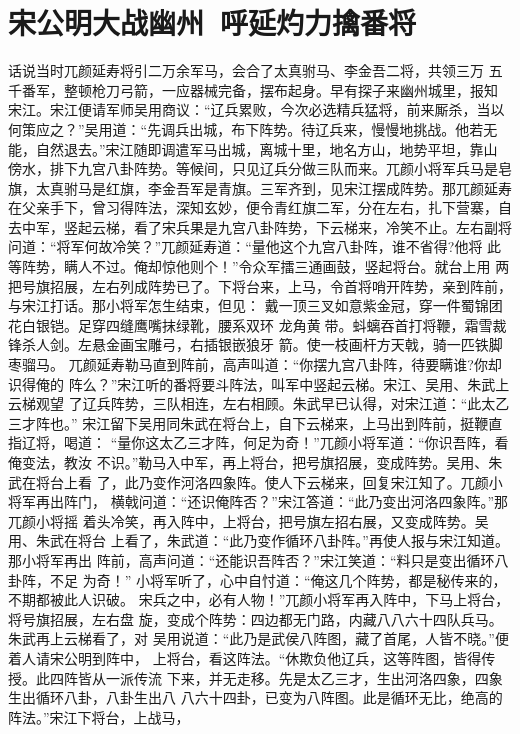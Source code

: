 \chapter{宋公明大战幽州~呼延灼力擒番将}

话说当时兀颜延寿将引二万余军马，会合了太真驸马、李金吾二将，共领三万
五千番军，整顿枪刀弓箭，一应器械完备，摆布起身。早有探子来幽州城里，报知
宋江。宋江便请军师吴用商议：“辽兵累败，今次必选精兵猛将，前来厮杀，当以
何策应之？”吴用道：“先调兵出城，布下阵势。待辽兵来，慢慢地挑战。他若无
能，自然退去。”宋江随即调遣军马出城，离城十里，地名方山，地势平坦，靠山
傍水，排下九宫八卦阵势。等候间，只见辽兵分做三队而来。兀颜小将军兵马是皂
旗，太真驸马是红旗，李金吾军是青旗。三军齐到，见宋江摆成阵势。那兀颜延寿
在父亲手下，曾习得阵法，深知玄妙，便令青红旗二军，分在左右，扎下营寨，自
去中军，竖起云梯，看了宋兵果是九宫八卦阵势，下云梯来，冷笑不止。左右副将
问道：“将军何故冷笑？”兀颜延寿道：“量他这个九宫八卦阵，谁不省得?他将
此等阵势，瞒人不过。俺却惊他则个！”令众军擂三通画鼓，竖起将台。就台上用
两把号旗招展，左右列成阵势已了。下将台来，上马，令首将哨开阵势，亲到阵前，
与宋江打话。那小将军怎生结束，但见：
戴一顶三叉如意紫金冠，穿一件蜀锦团花白银铠。足穿四缝鹰嘴抹绿靴，腰系双环
龙角黄带。蚪螭吞首打将鞭，霜雪裁锋杀人剑。左悬金画宝雕弓，右插银嵌狼牙
箭。使一枝画杆方天戟，骑一匹铁脚枣骝马。
兀颜延寿勒马直到阵前，高声叫道：“你摆九宫八卦阵，待要瞒谁?你却识得俺的
阵么？”宋江听的番将要斗阵法，叫军中竖起云梯。宋江、吴用、朱武上云梯观望
了辽兵阵势，三队相连，左右相顾。朱武早已认得，对宋江道：“此太乙三才阵也。”
宋江留下吴用同朱武在将台上，自下云梯来，上马出到阵前，挺鞭直指辽将，喝道：
“量你这太乙三才阵，何足为奇！”兀颜小将军道：“你识吾阵，看俺变法，教汝
不识。”勒马入中军，再上将台，把号旗招展，变成阵势。吴用、朱武在将台上看
了，此乃变作河洛四象阵。使人下云梯来，回复宋江知了。兀颜小将军再出阵门，
横戟问道：“还识俺阵否？”宋江答道：“此乃变出河洛四象阵。”那兀颜小将摇
着头冷笑，再入阵中，上将台，把号旗左招右展，又变成阵势。吴用、朱武在将台
上看了，朱武道：“此乃变作循环八卦阵。”再使人报与宋江知道。那小将军再出
阵前，高声问道：“还能识吾阵否？”宋江笑道：“料只是变出循环八卦阵，不足
为奇！”
小将军听了，心中自忖道：“俺这几个阵势，都是秘传来的，不期都被此人识破。
宋兵之中，必有人物！”兀颜小将军再入阵中，下马上将台，将号旗招展，左右盘
旋，变成个阵势：四边都无门路，内藏八八六十四队兵马。朱武再上云梯看了，对
吴用说道：“此乃是武侯八阵图，藏了首尾，人皆不晓。”便着人请宋公明到阵中，
上将台，看这阵法。“休欺负他辽兵，这等阵图，皆得传授。此四阵皆从一派传流
下来，并无走移。先是太乙三才，生出河洛四象，四象生出循环八卦，八卦生出八
八六十四卦，已变为八阵图。此是循环无比，绝高的阵法。”宋江下将台，上战马，

